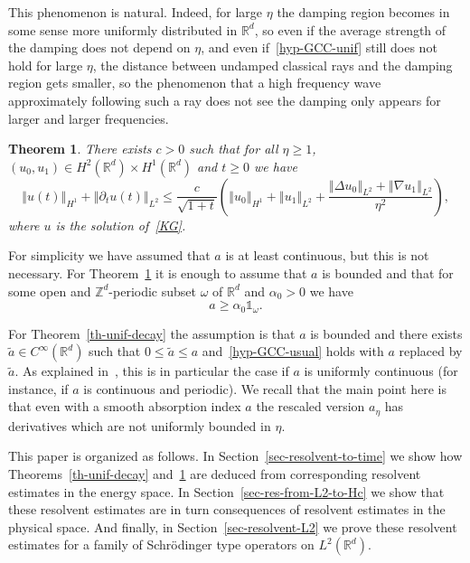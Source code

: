 \documentclass[11pt]{article}
\newtheorem{theo}{Theorem}[section]
\theoremstyle{definition}
\numberwithin{equation}{section}
\numberwithin{figure}{section}
\numberwithin{table}{section}
\newcommand{\nr}[1]{\left\Vert #1\right\Vert}
\renewcommand{\leq}{\leqslant}
\renewcommand{\geq}{\geqslant}
\newcommand{\1}{\mathds 1}
\newcommand{\R}{\mathbb{R}}
\renewcommand{\a}{\alpha}
\newcommand{\D}{\Delta}
\renewcommand{\o}{\omega}
\begin{document}
This phenomenon is natural. Indeed, for large $\eta$ the damping region becomes in some sense more uniformly distributed in $\R^d$, so even if the average strength of the damping does not depend on $\eta$, and even if~\eqref{hyp-GCC-unif} still does not hold for large $\eta$, the distance between undamped classical rays and the damping region gets smaller, so the phenomenon that a high frequency wave approximately following such a ray does not see the damping only appears for larger and larger frequencies.

\begin{theo}\label{th-no-GCC}
There exists $c > 0$ such that for all $\eta \geq 1$, $(u_0,u_1) \in H^2(\R^d) \times H^1(\R^d)$ and $t \geq 0$ we have
\[
\nr{u(t)}_{H^1} + \nr{\partial_t u(t)}_{L^2} \leq \frac c {\sqrt {1+t}} \left(\nr{u_0}_{H^1} + \nr{u_1}_{L^2} + \frac {\nr{\D u_0}_{L^2} + \nr{\nabla u_1}_{L^2}}{\eta^2} \right),
\]
where $u$ is the solution of~\eqref{KG}.
\end{theo}

For simplicity we have assumed that $a$ is at least continuous, but this is not necessary. For Theorem~\ref{th-no-GCC} it is enough to assume that $a$ is bounded and that for some open and $\mathbb Z^d$-periodic subset $\o$ of $\R^d$ and $\a_0 > 0$ we have
\begin{equation}\label{hyp-minor-a}
a \geq \a_0 \1_{\o}.
\end{equation}

For Theorem~\ref{th-unif-decay} the assumption is that $a$ is bounded and there exists $\tilde a \in C^\infty(\R^d)$ such that $0 \leq \tilde a \leq a$ and~\eqref{hyp-GCC-usual} holds with $a$ replaced by $\tilde a$. As explained in~\cite{BurqJo}, this is in particular the case if $a$ is uniformly continuous (for instance, if $a$ is continuous and periodic). We recall that the main point here is that even with a smooth absorption index $a$ the rescaled version $a_\eta$ has derivatives which are not uniformly bounded in $\eta$.%

\goodbreak
This paper is organized as follows. In Section~\ref{sec-resolvent-to-time} we show how Theorems~\ref{th-unif-decay} and~\ref{th-no-GCC} are deduced from corresponding resolvent estimates in the energy space. In Section~\ref{sec-res-from-L2-to-Hc} we show that these resolvent estimates are in turn consequences of resolvent estimates in the physical space. And finally, in Section~\ref{sec-resolvent-L2} we prove these resolvent estimates for a family of Schr\"odinger type operators on $L^2(\R^d)$.
\end{document}
